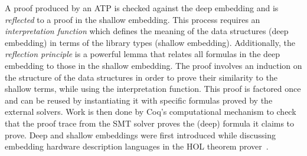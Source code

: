 \documentclass{article}
\begin{document}
	A proof produced by an 
	ATP is checked against the deep 
	embedding and is
	\textit{reflected} to a proof 
	in the shallow embedding. This 
	process requires an 
	\textit{interpretation function}
	which defines the meaning of 
	the data structures (deep embedding)
	in terms of the library types
	(shallow embedding). Additionally, 
	the \textit{reflection principle} 
	is a powerful lemma that relates 
	all formulas in the deep embedding
	to those in the shallow embedding. 
	The proof involves an induction 
	on the structure of the 
	data structures in order to prove 
	their similarity to 
	the shallow terms, while using 
	the interpretation function. This 
	proof is factored once and can be 
	reused by instantiating it with 
	specific formulas proved by the 
	external solvers. Work is then 
	done by Coq's computational 
	mechanism to check that the proof 
	trace from the SMT solver proves 
	the (deep) formula it claims to 
	prove. Deep and shallow 
	embeddings were first introduced 
	while discussing embedding 
	hardware description languages 
	in the HOL theorem 
	prover~\cite{10.5555/645902.672777}.
	
\end{document}
